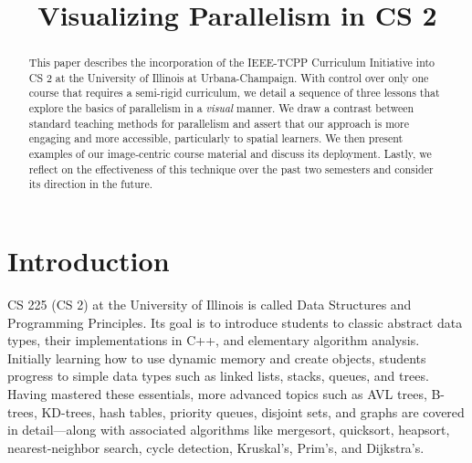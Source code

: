 \documentclass[conference]{./IEEEtran}
\begin{document}
\title{Visualizing Parallelism in CS 2}

\author{%
    \and
}

\maketitle

\begin{abstract}
This paper describes the incorporation of the IEEE-TCPP Curriculum Initiative
into CS 2 at the University of Illinois at Urbana-Champaign. With control over
only one course that requires a semi-rigid curriculum, we detail a sequence of
three lessons that explore the basics of parallelism in a \emph{visual} manner.
We draw a contrast between standard teaching methods for parallelism and assert
that our approach is more engaging and more accessible, particularly to spatial
learners.  We then present examples of our image-centric course material and
discuss its deployment.  Lastly, we reflect on the effectiveness of this
technique over the past two semesters and consider its direction in the future.
\end{abstract}

\section{Introduction}

CS 225 (CS 2) at the University of Illinois is called Data Structures and
Programming Principles.  Its goal is to introduce students to classic abstract
data types, their implementations in C++, and elementary algorithm analysis.
Initially learning how to use dynamic memory and create objects, students
progress to simple data types such as linked lists, stacks, queues, and trees.
Having mastered these essentials, more advanced topics such as AVL trees,
B-trees, KD-trees, hash tables, priority queues, disjoint sets, and graphs are
covered in detail---along with associated algorithms like mergesort, quicksort,
heapsort, nearest-neighbor search, cycle detection, Kruskal's, Prim's, and
Dijkstra's.
\end{document}
